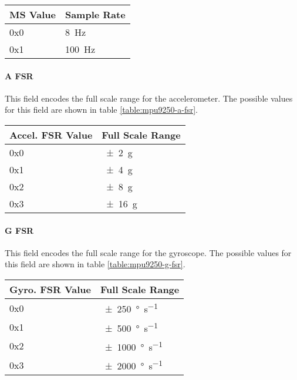 \begin{table*}[htb]
\centering
\begin{tabular}{@{}ll@{}}
\toprule
MS Value   &   Sample Rate \\
\midrule
0x0        &   {\SI{8}{\hertz}} \\
0x1        &   {\SI{100}{\hertz}} \\
\bottomrule
\end{tabular}
\caption{MPU9250 Magnetometer Sample Rate Values}
\label{table:mpu9250-mag-odr}
\end{table*}

\paragraph{A FSR}
This field encodes the full scale range for the accelerometer. The possible
values for this field are shown in table \ref{table:mpu9250-a-fsr}.

\begin{table*}[htb]
\centering
\begin{tabular}{@{}ll@{}}
\toprule
Accel. FSR Value    &   Full Scale Range \\
\midrule
0x0                 &   {\SI{\pm 2}{g}} \\
0x1                 &   {\SI{\pm 4}{g}} \\
0x2                 &   {\SI{\pm 8}{g}} \\
0x3                 &   {\SI{\pm 16}{g}} \\
\bottomrule
\end{tabular}
\caption{MPU9250 Accelerometer Full Scale Range Values}
\label{table:mpu9250-a-fsr}
\end{table*}

\paragraph{G FSR}
This field encodes the full scale range for the gyroscope. The possible
values for this field are shown in table \ref{table:mpu9250-g-fsr}.

\begin{table*}[htb]
\centering
\begin{tabular}{@{}ll@{}}
\toprule
Gyro. FSR Value     &   Full Scale Range \\
\midrule
0x0                 &   {\SI{\pm 250}{\degree\per\second}} \\
0x1                 &   {\SI{\pm 500}{\degree\per\second}} \\
0x2                 &   {\SI{\pm 1000}{\degree\per\second}} \\
0x3                 &   {\SI{\pm 2000}{\degree\per\second}} \\
\bottomrule
\end{tabular}
\caption{MPU9250 Gyroscope Full Scale Range Values}
\label{table:mpu9250-g-fsr}
\end{table*}


